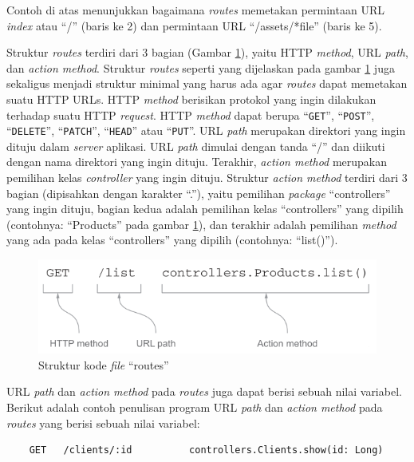 Contoh di atas menunjukkan bagaimana \textit{routes} memetakan permintaan URL \textit{index} atau ``/'' (baris ke 2) dan permintaan URL ``/assets/*file'' (baris ke 5).

Struktur \textit{routes} terdiri dari 3 bagian (Gambar \ref{fig:2_routes}), yaitu HTTP \textit{method}, URL \textit{path}, dan \textit{action method}. Struktur \textit{routes} seperti yang dijelaskan pada gambar \ref{fig:2_routes} juga sekaligus menjadi struktur minimal yang harus ada agar \textit{routes} dapat memetakan suatu HTTP URLs. HTTP \textit{method} berisikan protokol yang ingin dilakukan terhadap suatu HTTP \textit{request}. HTTP \textit{method} dapat berupa ``\texttt{GET}'', ``\texttt{POST}'', ``\texttt{DELETE}'', ``\texttt{PATCH}'', ``\texttt{HEAD}'' atau ``\texttt{PUT}''\cite{playframeworkweb}. URL \textit{path} merupakan direktori yang ingin dituju dalam \textit{server} aplikasi. URL \textit{path} dimulai dengan tanda ``/'' dan diikuti dengan nama direktori yang ingin dituju. Terakhir, \textit{action method} merupakan pemilihan kelas \textit{controller} yang ingin dituju. Struktur \textit{action method} terdiri dari 3 bagian (dipisahkan dengan karakter ``.''), yaitu pemilihan \textit{package} ``controllers'' yang ingin dituju, bagian kedua adalah pemilihan kelas ``controllers'' yang dipilih (contohnya: ``Products'' pada gambar \ref{fig:2_routes}), dan terakhir adalah pemilihan \textit{method} yang ada pada kelas ``controllers'' yang dipilih (contohnya: ``list()'').

\begin{figure}[htbp]
	\centering
		\includegraphics[scale=0.8]{Gambar/2_routes.PNG}
	\caption{Struktur kode \textit{file} ``routes''\cite{playforjava}}
	\label{fig:2_routes}
\end{figure}

URL \textit{path} dan \textit{action method} pada \textit{routes} juga dapat berisi sebuah nilai variabel. Berikut adalah contoh penulisan program URL \textit{path} dan \textit{action method} pada \textit{routes} yang berisi sebuah nilai variabel:

\begin{lstlisting}
	GET   /clients/:id          controllers.Clients.show(id: Long)
\end{lstlisting}

